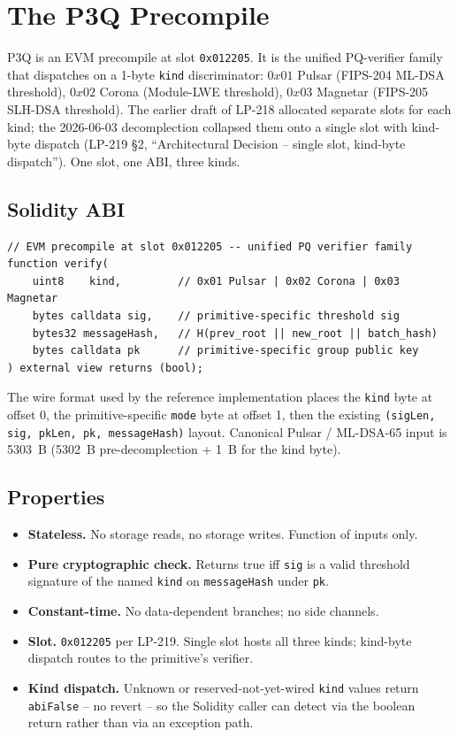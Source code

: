 \section{The P3Q Precompile}

P3Q is an EVM precompile at slot \texttt{0x012205}. It is the unified
PQ-verifier family that dispatches on a 1-byte \texttt{kind}
discriminator: $0x01$ Pulsar (FIPS-204 ML-DSA threshold), $0x02$
Corona (Module-LWE threshold), $0x03$ Magnetar (FIPS-205 SLH-DSA
threshold). The earlier draft of LP-218 allocated separate slots for
each kind; the 2026-06-03 decomplection collapsed them onto a single
slot with kind-byte dispatch (LP-219 \S 2,
``Architectural Decision -- single slot, kind-byte dispatch'').
One slot, one ABI, three kinds.

\subsection{Solidity ABI}

\begin{verbatim}
// EVM precompile at slot 0x012205 -- unified PQ verifier family
function verify(
    uint8    kind,         // 0x01 Pulsar | 0x02 Corona | 0x03 Magnetar
    bytes calldata sig,    // primitive-specific threshold sig
    bytes32 messageHash,   // H(prev_root || new_root || batch_hash)
    bytes calldata pk      // primitive-specific group public key
) external view returns (bool);
\end{verbatim}

The wire format used by the reference implementation places the
\texttt{kind} byte at offset 0, the primitive-specific
\texttt{mode} byte at offset 1, then the existing \texttt{(sigLen,
sig, pkLen, pk, messageHash)} layout. Canonical Pulsar / ML-DSA-65
input is \SI{5303}{B} (\SI{5302}{B} pre-decomplection + \SI{1}{B}
for the kind byte).

\subsection{Properties}

\begin{itemize}[leftmargin=2em,nosep]
\item \textbf{Stateless.} No storage reads, no storage writes.
  Function of inputs only.
\item \textbf{Pure cryptographic check.} Returns true iff
  \texttt{sig} is a valid threshold signature of the named
  \texttt{kind} on \texttt{messageHash} under \texttt{pk}.
\item \textbf{Constant-time.} No data-dependent branches; no side
  channels.
\item \textbf{Slot.} \texttt{0x012205} per LP-219.
  Single slot hosts all three kinds; kind-byte dispatch routes to the
  primitive's verifier.
\item \textbf{Kind dispatch.} Unknown or reserved-not-yet-wired
  \texttt{kind} values return \texttt{abiFalse} -- no revert -- so the
  Solidity caller can detect via the boolean return rather than via
  an exception path.
\end{itemize}

